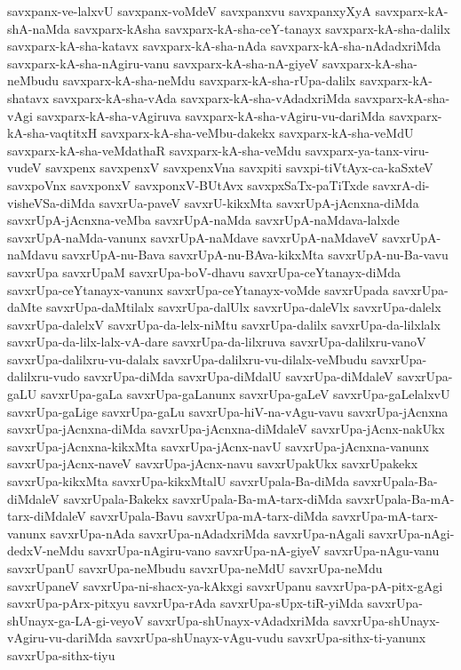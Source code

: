 {savxpanx-ve-lalxvU
savxpanx-voMdeV
savxpanxvu
savxpanxyXyA
savxparx-kA-shA-naMda
savxparx-kAsha
savxparx-kA-sha-ceY-tanayx
savxparx-kA-sha-dalilx
savxparx-kA-sha-katavx
savxparx-kA-sha-nAda
savxparx-kA-sha-nAdadxriMda
savxparx-kA-sha-nAgiru-vanu
savxparx-kA-sha-nA-giyeV
savxparx-kA-sha-neMbudu
savxparx-kA-sha-neMdu
savxparx-kA-sha-rUpa-dalilx
savxparx-kA-shatavx
savxparx-kA-sha-vAda
savxparx-kA-sha-vAdadxriMda
savxparx-kA-sha-vAgi
savxparx-kA-sha-vAgiruva
savxparx-kA-sha-vAgiru-vu-dariMda
savxparx-kA-sha-vaqtitxH
savxparx-kA-sha-veMbu-dakekx
savxparx-kA-sha-veMdU
savxparx-kA-sha-veMdathaR
savxparx-kA-sha-veMdu
savxparx-ya-tanx-viru-vudeV
savxpenx
savxpenxV
savxpenxVna
savxpiti
savxpi-tiVtAyx-ca-kaSxteV
savxpoVnx
savxponxV
savxponxV-BUtAvx
savxpxSaTx-paTiTxde
savxrA-di-visheVSa-diMda
savxrUa-paveV
savxrU-kikxMta
savxrUpA-jAcnxna-diMda
savxrUpA-jAcnxna-veMba
savxrUpA-naMda
savxrUpA-naMdava-lalxde
savxrUpA-naMda-vanunx
savxrUpA-naMdave
savxrUpA-naMdaveV
savxrUpA-naMdavu
savxrUpA-nu-Bava
savxrUpA-nu-BAva-kikxMta
savxrUpA-nu-Ba-vavu
savxrUpa
savxrUpaM
savxrUpa-boV-dhavu
savxrUpa-ceYtanayx-diMda
savxrUpa-ceYtanayx-vanunx
savxrUpa-ceYtanayx-voMde
savxrUpada
savxrUpa-daMte
savxrUpa-daMtilalx
savxrUpa-dalUlx
savxrUpa-daleVlx
savxrUpa-dalelx
savxrUpa-dalelxV
savxrUpa-da-lelx-niMtu
savxrUpa-dalilx
savxrUpa-da-lilxlalx
savxrUpa-da-lilx-lalx-vA-dare
savxrUpa-da-lilxruva
savxrUpa-dalilxru-vanoV
savxrUpa-dalilxru-vu-dalalx
savxrUpa-dalilxru-vu-dilalx-veMbudu
savxrUpa-dalilxru-vudo
savxrUpa-diMda
savxrUpa-diMdalU
savxrUpa-diMdaleV
savxrUpa-gaLU
savxrUpa-gaLa
savxrUpa-gaLanunx
savxrUpa-gaLeV
savxrUpa-gaLelalxvU
savxrUpa-gaLige
savxrUpa-gaLu
savxrUpa-hiV-na-vAgu-vavu
savxrUpa-jAcnxna
savxrUpa-jAcnxna-diMda
savxrUpa-jAcnxna-diMdaleV
savxrUpa-jAcnx-nakUkx
savxrUpa-jAcnxna-kikxMta
savxrUpa-jAcnx-navU
savxrUpa-jAcnxna-vanunx
savxrUpa-jAcnx-naveV
savxrUpa-jAcnx-navu
savxrUpakUkx
savxrUpakekx
savxrUpa-kikxMta
savxrUpa-kikxMtalU
savxrUpala-Ba-diMda
savxrUpala-Ba-diMdaleV
savxrUpala-Bakekx
savxrUpala-Ba-mA-tarx-diMda
savxrUpala-Ba-mA-tarx-diMdaleV
savxrUpala-Bavu
savxrUpa-mA-tarx-diMda
savxrUpa-mA-tarx-vanunx
savxrUpa-nAda
savxrUpa-nAdadxriMda
savxrUpa-nAgali
savxrUpa-nAgi-dedxV-neMdu
savxrUpa-nAgiru-vano
savxrUpa-nA-giyeV
savxrUpa-nAgu-vanu
savxrUpanU
savxrUpa-neMbudu
savxrUpa-neMdU
savxrUpa-neMdu
savxrUpaneV
savxrUpa-ni-shacx-ya-kAkxgi
savxrUpanu
savxrUpa-pA-pitx-gAgi
savxrUpa-pArx-pitxyu
savxrUpa-rAda
savxrUpa-sUpx-tiR-yiMda
savxrUpa-shUnayx-ga-LA-gi-veyoV
savxrUpa-shUnayx-vAdadxriMda
savxrUpa-shUnayx-vAgiru-vu-dariMda
savxrUpa-shUnayx-vAgu-vudu
savxrUpa-sithx-ti-yanunx
savxrUpa-sithx-tiyu
}
